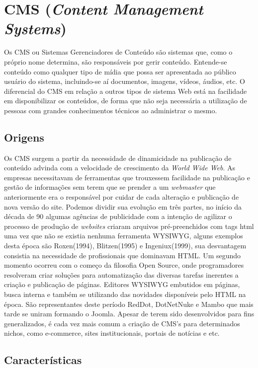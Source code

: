 \documentclass[12pt]{article}
\begin{document}
\section{CMS (\textit{Content Management Systems})}

Os CMS ou Sistemas Gerenciadores de Conteúdo são sistemas que, como o próprio nome determina, são responsáveis por gerir conteúdo. Entende-se 
conteúdo como qualquer tipo de mídia que possa ser apresentada ao público usuário do sistema, incluindo-se aí documentos, imagens, vídeos, áudios, 
etc. O diferencial do CMS em relação a outros tipos de sistema Web está na facilidade em disponibilizar os conteúdos, de forma que não seja 
necessária a utilização de pessoas com grandes conhecimentos técnicos ao administrar o mesmo.

\subsection{Origens}

Os CMS surgem a partir da necessidade de dinamicidade na publicação de conteúdo advinda com a velocidade de crescimento da \textit{World Wide Web}. 
As empresas necessitavam de ferramentas que trouxessem facilidade na publicação e gestão de informações sem terem que se prender a um 
\textit{webmaster} que anteriormente era o responsável por cuidar de cada alteração e publicação de nova versão do site. Podemos dividir sua 
evolução em três partes, no início da década de 90 algumas agências de publicidade com a intenção de agilizar o processo de produção de 
\textit{websites} criaram arquivos pré-preenchidos com tags html uma vez que não se existia nenhuma ferramenta WYSIWYG, alguns exemplos desta 
época são Roxen(1994), Blitzen(1995) e Ingeniux(1999), sua desvantagem consistia na necessidade de profissionais que dominavam HTML. 
Um segundo momento ocorreu com o começo da filosofia Open Source, onde programadores resolveram criar soluções para automatização das diversas 
tarefas inerentes a criação e publicação de páginas. Editores WYSIWYG embutidos em páginas, busca interna e também se utilizando das novidades 
disponíveis pelo HTML na época. São representantes deste período RedDot, DotNetNuke e Mambo que mais tarde se uniram formando o Joomla. Apesar de 
terem sido desenvolvidos para fins generalizados, é cada vez mais comum a criação de CMS’s para determinados nichos, como e-commerce, sites 
institucionais, portais de notícias e etc.

\subsection{Características}
\end{document}
